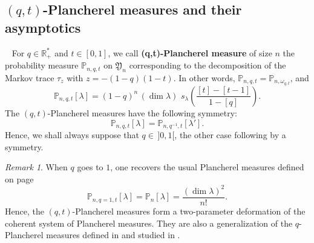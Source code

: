 \documentclass[smallextended,nospthms]{svjour3}
\theoremstyle{remark}
\newtheorem*{remark}{Remark}
\newcommand{\R}{\mathbb{R}}
\newcommand{\ym}{\mathfrak{Y}}
\newcommand{\proba}{\mathbb{P}}
\begin{document}
\subsection{$(q,t)$-Plancherel measures and their asymptotics}\label{qtasymptotic}~
For $q \in \R_{+}^{*}$ and $t \in [0,1]$, we call \textbf{(q,t)-Plancherel measure} of size $n$ the probability measure $\proba_{n,q,t}$ on $\ym_{n}$ corresponding to the decomposition of the Markov trace $\tau_{z}$ with $z=-(1-q)(1-t)$. In other words, $\proba_{n,q,t}=\proba_{n,\omega_{q,t}}$, and
$$
\proba_{n,q,t}[\lambda]=(1-q)^{n}\,(\dim \lambda)\,\, s_{\lambda}\left(\frac{[t]-[t-1]}{1-[q]}\right).$$
The $(q,t)$-Plancherel measures have the following symmetry: $$\proba_{n,q,t}[\lambda]=\proba_{n,q^{-1},t}[\lambda'].$$
Hence, we shall always suppose that $q \in\, ]0,1[$, the other case following by a symmetry. 
\begin{remark}
When $q$ goes to $1$, one recovers the usual Plancherel measures defined on page \pageref{csspezialschur} 
$$\proba_{n,q=1,t}[\lambda]=\proba_{n}[\lambda]=\frac{(\dim \lambda)^{2}}{n!}.$$
Hence, the $(q,t)$-Plancherel measures form a two-parameter deformation of the coherent system of Plancherel measures. They are also a generalization of the $q$-Plancherel measures defined in \cite{Ker92,Stra08} and studied in \cite{FM10}.
\end{remark}
\bigskip\bigskip
\end{document}
